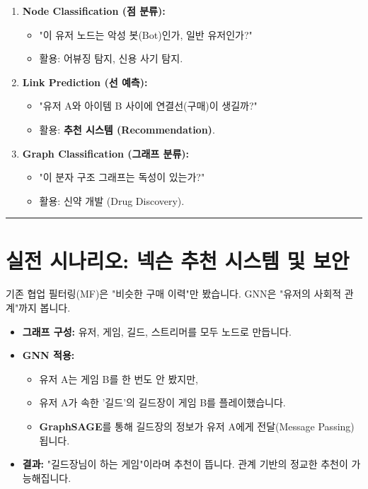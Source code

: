 \documentclass[11pt,a4paper]{book}
\theoremstyle{definition}
\begin{document}
\begin{enumerate}
    \item \textbf{Node Classification (점 분류):}
    \begin{itemize}
        \item "이 유저 노드는 악성 봇(Bot)인가, 일반 유저인가?"
        \item 활용: 어뷰징 탐지, 신용 사기 탐지.
    \end{itemize}
    
    \item \textbf{Link Prediction (선 예측):}
    \begin{itemize}
        \item "유저 A와 아이템 B 사이에 연결선(구매)이 생길까?"
        \item 활용: \textbf{추천 시스템 (Recommendation)}.
    \end{itemize}
    
    \item \textbf{Graph Classification (그래프 분류):}
    \begin{itemize}
        \item "이 분자 구조 그래프는 독성이 있는가?"
        \item 활용: 신약 개발 (Drug Discovery).
    \end{itemize}
\end{enumerate}

\vspace{0.5cm}\hrule\vspace{0.5cm}

\section{실전 시나리오: 넥슨 추천 시스템 및 보안}

\begin{storybox}[title={Scenario 1: 차세대 게임 추천 시스템 (Link Prediction)}]
기존 협업 필터링(MF)은 "비슷한 구매 이력"만 봤습니다. GNN은 "유저의 사회적 관계"까지 봅니다.
\end{storybox}
\begin{itemize}
    \item \textbf{그래프 구성:} 유저, 게임, 길드, 스트리머를 모두 노드로 만듭니다.
    \item \textbf{GNN 적용:}
    \begin{itemize}
        \item 유저 A는 게임 B를 한 번도 안 봤지만,
        \item 유저 A가 속한 '길드'의 길드장이 게임 B를 플레이했습니다.
        \item \textbf{GraphSAGE}를 통해 길드장의 정보가 유저 A에게 전달(Message Passing)됩니다.
    \end{itemize}
    \item \textbf{결과:} "길드장님이 하는 게임"이라며 추천이 뜹니다. 관계 기반의 정교한 추천이 가능해집니다.
\end{itemize}
\end{document}
